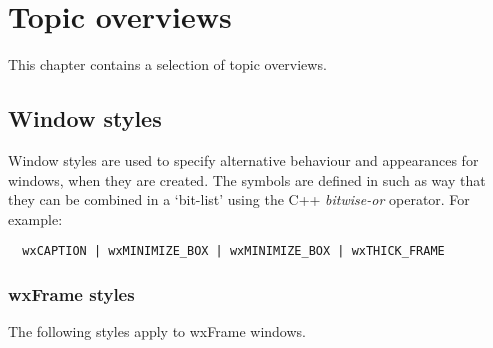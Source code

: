 \chapter{Topic overviews}\label{overviews}
%
\setfooter{\thepage}{}{}{}{}{\thepage}%

This chapter contains a selection of topic overviews.

\section{Window styles}\label{windowstyles}

Window styles are used to specify alternative behaviour and appearances for windows, when they are
created. The symbols are defined in such as way that they can be combined in a `bit-list' using the
C++ {\it bitwise-or} operator. For example:

\begin{verbatim}
  wxCAPTION | wxMINIMIZE_BOX | wxMINIMIZE_BOX | wxTHICK_FRAME
\end{verbatim}

\subsection{wxFrame styles}

The following styles apply to wxFrame windows.

